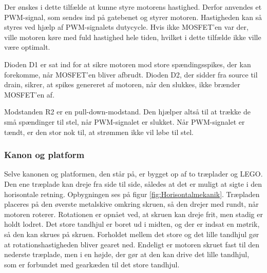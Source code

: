 Der ønskes i dette tilfælde at kunne styre motorens hastighed. Derfor anvendes et PWM-signal, som sendes ind på gatebenet og styrer motoren. Hastigheden kan så styres ved hjælp af PWM-signalets dutycycle. Hvis ikke MOSFET'en var der, ville motoren køre med fuld hastighed hele tiden, hvilket i dette tilfælde ikke ville være optimalt. 

Dioden D1 er sat ind for at sikre motoren mod store spændingsspikes, der kan forekomme, når MOSFET'en bliver afbrudt. Dioden D2, der sidder fra source til drain, sikrer, at spikes genereret af motoren, når den slukkes, ikke brænder MOSFET'en af. 

Modstanden R2 er en pull-down-modstand. Den hjælper altså til at trække de små spændinger til stel, når PWM-signalet er slukket. Når PWM-signalet er tændt, er den stor nok til, at strømmen ikke vil løbe til stel. 

\subsubsection{Kanon og platform}
Selve kanonen og platformen, den står på, er bygget op af to træplader og LEGO. Den ene træplade kan dreje fra side til side, således at det er muligt at sigte i den horisontale retning. Opbygningen ses på figur \ref{fig:Horisontalmekanik}. Træpladen placeres på den øverste metalskive omkring skruen, så den drejer med rundt, når motoren roterer. Rotationen er opnået ved, at skruen kan dreje frit, men stadig er holdt lodret. Det store tandhjul er boret ud i midten, og der er indsat en møtrik, så den kan skrues på skruen. Forholdet mellem det store og det lille tandhjul gør at rotationshastigheden bliver gearet ned. Endeligt er motoren skruet fast til den nederste træplade, men i en højde, der gør at den kan drive det lille tandhjul, som er forbundet med gearkæden til det store tandhjul. 

